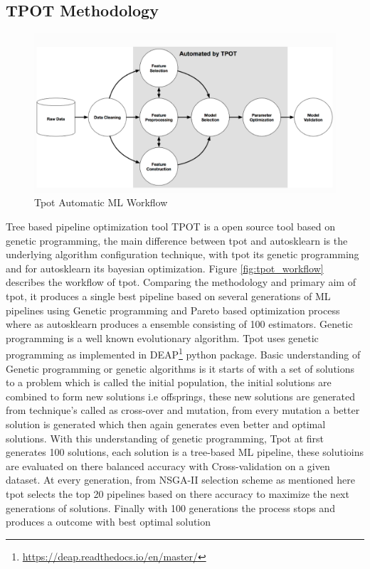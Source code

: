     
\subsection{TPOT Methodology}
    
    \begin{figure}[!h]
    	\centering
    	\includegraphics[width=1.1\linewidth]{thesis_template/images/tpot-git-workflow.png}
    	\caption{Tpot Automatic ML Workflow}
    	\label{fig:tpot_git_workflow}
    \end{figure}
Tree based pipeline optimization tool TPOT\cite{tpot} is a open source tool based on genetic programming, the main difference between tpot and autosklearn is the underlying algorithm configuration technique, with tpot its genetic programming and for autosklearn its bayesian optimization. Figure \ref{fig:tpot_workflow} describes the workflow of tpot. Comparing the methodology and primary aim of tpot, it produces a single best pipeline based on several generations of ML pipelines using Genetic programming and Pareto based optimization process where as autosklearn produces a ensemble consisting of 100 estimators.
Genetic programming is a well known evolutionary algorithm. Tpot uses genetic programming as implemented in DEAP\footnote{\url{https://deap.readthedocs.io/en/master/}} python package. Basic understanding of Genetic programming or genetic algorithms is  it starts of with a set of solutions to a problem which is called the initial population, the initial solutions are combined to form new solutions i.e offsprings, these new solutions are generated from technique's called as cross-over and mutation, from every mutation a better solution is generated which then again generates even better and optimal solutions. With this understanding of genetic programming, Tpot at first generates 100 solutions, each solution is a tree-based ML pipeline, these solutioins are evaluated on there balanced accuracy with Cross-validation on a given dataset. At every generation, from NSGA-II selection scheme as mentioned here\cite{tpot} tpot selects the top 20 pipelines based on there accuracy to maximize the next generations of solutions. Finally with 100 generations the process stops and produces a outcome with best optimal solution 
        
